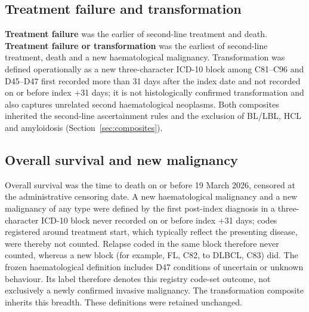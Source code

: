 \documentclass[10pt]{article}
\begin{document}
\subsection{Treatment failure and transformation}
\textbf{Treatment failure} was the earlier of second-line treatment and death.
\textbf{Treatment failure or transformation} was the earliest of second-line
treatment, death and a new haematological malignancy. Transformation was
defined operationally as a new three-character ICD-10 block among C81--C96 and
D45--D47 first recorded more than 31 days after the index date and not recorded
on or before index $+$31 days; it is not histologically confirmed
transformation and also captures unrelated second haematological neoplasms.
Both composites inherited the second-line ascertainment rules and the exclusion
of BL/LBL, HCL and amyloidosis (Section~\ref{sec:composites}).

\subsection{Overall survival and new malignancy}
Overall survival was the time to death on or before 19 March 2026, censored at
the administrative censoring date. A new haematological malignancy and a new
malignancy of any type were defined by the first post-index diagnosis in a
three-character ICD-10 block never recorded on or before index $+$31 days;
codes registered around treatment start, which typically reflect the presenting
disease, were thereby not counted. Relapse coded in the same block therefore
never counted, whereas a new block (for example, FL, C82, to DLBCL, C83) did.
The frozen haematological definition includes D47 conditions of uncertain or
unknown behaviour. Its label therefore denotes this registry code-set outcome,
not exclusively a newly confirmed invasive malignancy. The transformation
composite inherits this breadth. These definitions were retained unchanged.
\end{document}
